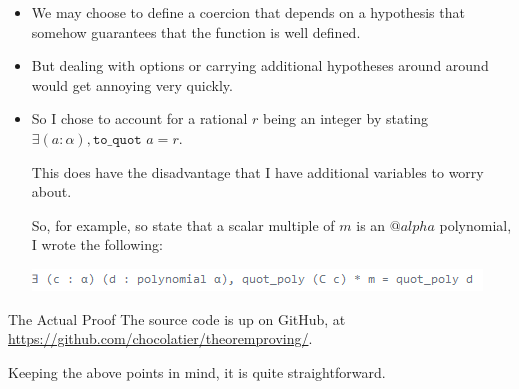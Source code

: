 \documentclass{beamer}
\begin{document}
\begin{frame}
  \begin{itemize}
    \item We may choose to define a coercion that depends on a hypothesis that somehow guarantees that the function is well defined. 
    \item But dealing with options or carrying additional hypotheses around around would get annoying very quickly.
    \item So I chose to account for a rational $r$ being an integer by stating 
    $\exists(a : \alpha), \texttt{to\_quot } a = r$. 

    This does have the disadvantage that I have additional variables to worry about. 

    So, for example, so state that a scalar multiple of $m$ is an $@alpha$ polynomial, I wrote the following:

    \includegraphics[width=\textwidth]{exists.png}


  \end{itemize}

\end{frame}

\begin{frame}{The Actual Proof}
    The source code is up on GitHub, at \url{https://github.com/chocolatier/theoremproving/}. 
    
    Keeping the above points in mind, it is quite straightforward. 
\end{frame}
\end{document}
